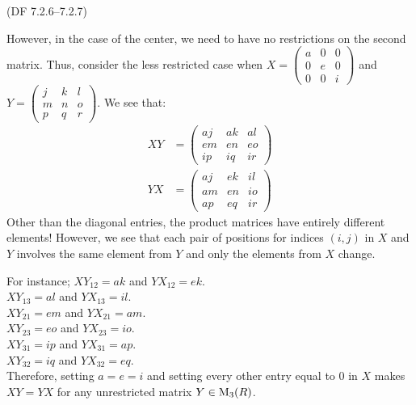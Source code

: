 \begin{problem}{(\textsf{DF 7.2.6--7.2.7})}
\begin{enumalph}
\begin{Answer}
        However, in the case of the center, we need to have no restrictions on the second matrix.
        Thus, consider the less restricted case when $X = \begin{pmatrix} a & 0 & 0 \\ 0 & e & 0 \\ 0 & 0 & i \end{pmatrix}$
        and $Y = \begin{pmatrix} j & k & l \\ m & n & o \\ p & q & r \end{pmatrix}$. We see that:
        \begin{align*}
          XY &= \begin{pmatrix} aj & ak & al \\ em & en & eo \\ ip & iq & ir \end{pmatrix} \\
          YX &= \begin{pmatrix} aj & ek & il \\ am & en & io \\ ap & eq & ir \end{pmatrix}
        \end{align*}
        Other than the diagonal entries, the product matrices have entirely different elements!
        However, we see that each pair of positions for indices $(i, j)$ in $X$ and $Y$
        involves the same element from $Y$ and only the elements from $X$ change.
        
        For instance;
        \centering
        $XY_{12} = ak$ and $YX_{12} = ek$. \\
        $XY_{13} = al$ and $YX_{13} = il$. \\
        $XY_{21} = em$ and $YX_{21} = am$. \\
        $XY_{23} = eo$ and $YX_{23} = io$. \\
        $XY_{31} = ip$ and $YX_{31} = ap$. \\
        $XY_{32} = iq$ and $YX_{32} = eq$. \\

        \flushleft
        Therefore, setting $a = e = i$ and setting every other entry equal to $0$ in $X$
        makes $XY = YX$ for any unrestricted matrix $Y \in \operatorname{M}_3(R)$.
      \end{Answer}
  \end{enumalph}
\end{problem}
